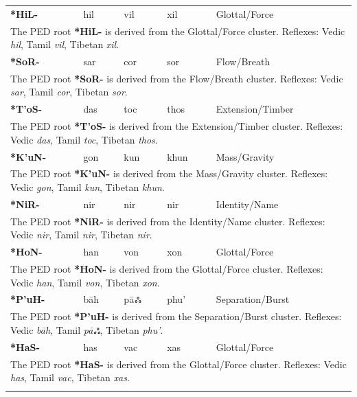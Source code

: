 \begin{longtable}{p{} p{} p{} p{} p{}}
\textbf{*HiL-} & hil & vil & xil & Glottal/Force \\ 
\multicolumn{5}{p{\textwidth}}{\small The PED root \textbf{*HiL-} is derived from the Glottal/Force cluster. Reflexes: Vedic \textit{hil}, Tamil \textit{vil}, Tibetan \textit{xil}. } \\ \addlinespace 
\textbf{*SoR-} & sar & cor & sor & Flow/Breath \\ 
\multicolumn{5}{p{\textwidth}}{\small The PED root \textbf{*SoR-} is derived from the Flow/Breath cluster. Reflexes: Vedic \textit{sar}, Tamil \textit{cor}, Tibetan \textit{sor}. } \\ \addlinespace 
\textbf{*T'oS-} & das & toc & thos & Extension/Timber \\ 
\multicolumn{5}{p{\textwidth}}{\small The PED root \textbf{*T'oS-} is derived from the Extension/Timber cluster. Reflexes: Vedic \textit{das}, Tamil \textit{toc}, Tibetan \textit{thos}. } \\ \addlinespace 
\textbf{*K'uN-} & gon & kun & khun & Mass/Gravity \\ 
\multicolumn{5}{p{\textwidth}}{\small The PED root \textbf{*K'uN-} is derived from the Mass/Gravity cluster. Reflexes: Vedic \textit{gon}, Tamil \textit{kun}, Tibetan \textit{khun}. } \\ \addlinespace 
\textbf{*NiR-} & nir & nir & nir & Identity/Name \\ 
\multicolumn{5}{p{\textwidth}}{\small The PED root \textbf{*NiR-} is derived from the Identity/Name cluster. Reflexes: Vedic \textit{nir}, Tamil \textit{nir}, Tibetan \textit{nir}. } \\ \addlinespace 
\textbf{*HoN-} & han & von & xon & Glottal/Force \\ 
\multicolumn{5}{p{\textwidth}}{\small The PED root \textbf{*HoN-} is derived from the Glottal/Force cluster. Reflexes: Vedic \textit{han}, Tamil \textit{von}, Tibetan \textit{xon}. } \\ \addlinespace 
\textbf{*P'uH-} & bāh & pāஃ & phu' & Separation/Burst \\ 
\multicolumn{5}{p{\textwidth}}{\small The PED root \textbf{*P'uH-} is derived from the Separation/Burst cluster. Reflexes: Vedic \textit{bāh}, Tamil \textit{pāஃ}, Tibetan \textit{phu'}. } \\ \addlinespace 
\textbf{*HaS-} & has & vac & xas & Glottal/Force \\ 
\multicolumn{5}{p{\textwidth}}{\small The PED root \textbf{*HaS-} is derived from the Glottal/Force cluster. Reflexes: Vedic \textit{has}, Tamil \textit{vac}, Tibetan \textit{xas}. } \\ \addlinespace 

\end{longtable}
